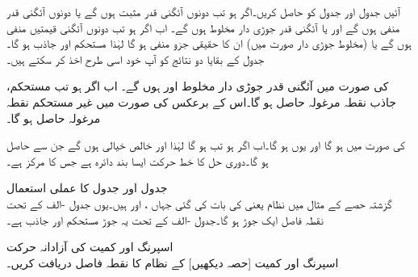 آئیں جدول  اور جدول  کو حاصل کریں۔اگر  ہو تب دونوں آئگنی قدر مثبت ہوں گے یا دونوں آئگنی قدر منفی ہوں گے اور یا آئگنی قدر جوڑی دار مخلوط ہوں گے۔ اب اگر  ہو تب دونوں آئگنی قیمتیں منفی ہوں گے یا (مخلوط جوڑی دار صورت میں) ان کا حقیقی جزو منفی ہو گا لہٰذا  مستحکم اور جاذب ہو گا۔ جدول  کے بقایا دو نتائج کو آپ خود اسی طرح اخذ کر سکتے ہیں۔

  کی صورت میں آئگنی قدر جوڑی دار مخلوط  اور  ہوں گے۔ اب اگر  ہو تب مستحکم، جاذب نقطہ مرغولہ حاصل ہو گا۔اس کے برعکس  کی صورت میں غیر مستحکم نقطہ مرغولہ حاصل ہو گا۔

 کی صورت میں  ہو گا اور یوں  ہو گا۔اب اگر  ہو تب   ہو گا لہٰذا  اور  خالص خیالی ہوں گے جن سے   حاصل ہو گا۔دوری حل کا خط حرکت ایسا بند دائرہ ہے جس کا مرکز  ہے۔

\quad جدول  اور جدول  کا عملی استعمال\\
گزشتہ حصے کے مثال  میں نظام  یعنی 
  کی بات کی گئی جہاں ،  اور  ہیں۔یوں جدول -الف کے تحت نقطہ فاصل ایک جوڑ ہو گا۔جدول -الف کے تحت یہ جوڑ مستحکم اور جاذب ہے۔

\quad اسپرنگ اور کمیت کی آزادانہ حرکت\\
اسپرنگ اور کمیت [حصہ  دیکھیں] کے نظام  کا نقطہ فاصل دریافت کریں۔

